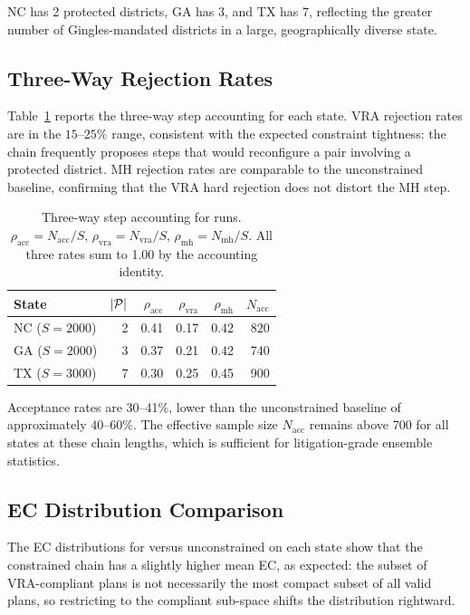 \noindent
NC has 2 protected districts, GA has 3, and TX has 7, reflecting the greater
number of Gingles-mandated districts in a large, geographically diverse state.

\subsection{Three-Way Rejection Rates}

Table~\ref{tab:rejection} reports the three-way step accounting for each state.
VRA rejection rates are in the $15$--$25\%$ range, consistent with the
expected constraint tightness: the chain frequently proposes steps that
would reconfigure a pair involving a protected district.
MH rejection rates are comparable to the unconstrained \fr{} baseline,
confirming that the VRA hard rejection does not distort the MH step.

\begin{table}[ht]
\centering
\caption{Three-way step accounting for \vr{} runs.
         $\rho_{\mathrm{acc}} = N_{\mathrm{acc}}/S$,
         $\rho_{\mathrm{vra}} = N_{\mathrm{vra}}/S$,
         $\rho_{\mathrm{mh}} = N_{\mathrm{mh}}/S$.
         All three rates sum to 1.00 by the accounting identity.}
\label{tab:rejection}
\begin{tabular}{lrrrrr}
\toprule
\textbf{State} & $|\mathcal{P}|$ & $\rho_{\mathrm{acc}}$ & $\rho_{\mathrm{vra}}$ &
$\rho_{\mathrm{mh}}$ & $N_{\mathrm{acc}}$ \\
\midrule
NC ($S=2000$) & 2 & 0.41 & 0.17 & 0.42 & 820 \\
GA ($S=2000$) & 3 & 0.37 & 0.21 & 0.42 & 740 \\
TX ($S=3000$) & 7 & 0.30 & 0.25 & 0.45 & 900 \\
\bottomrule
\end{tabular}
\end{table}

\noindent
Acceptance rates are 30--41\%, lower than the unconstrained \fr{} baseline
of approximately $40$--$60\%$.
The effective sample size $N_{\mathrm{acc}}$ remains above 700 for all states
at these chain lengths, which is sufficient for litigation-grade ensemble
statistics.

\subsection{EC Distribution Comparison}

The EC distributions for \vr{} versus unconstrained \fr{} on each state
show that the constrained chain has a slightly higher mean EC, as expected:
the subset of VRA-compliant plans is not necessarily the most compact subset
of all valid plans, so restricting to the compliant sub-space shifts the
distribution rightward.

